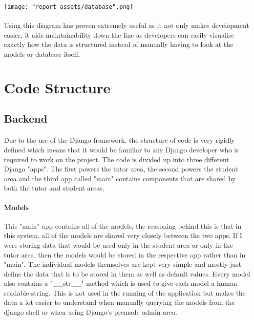 \documentclass[10pt]{report}
\begin{document}
	\vspace{+10px}
	\texttt{[image: "report assets/database".png]}
	
	\paragraph{}
	Using this diagram has proven extremely useful as it not only makes development easier, it aids
	maintainability down the line as developers can easily visualise exactly how the data is structured
	instead of manually having to look at the models or database itself.
	
	\section*{Code Structure}
	\subsection*{Backend}
	\paragraph{}
	Due to the use of the Django framework, the structure of code is very rigidly defined which means that
	it would be familiar to any Django developer who is required to work on the project.  The code is
	divided up into three different Django "apps".  The first powers the tutor area, the second powers the
	student area and the third app called "main" contains components that are shared by both the tutor and
	student areas.
	
	\paragraph{Models}
	This "main" app contains all of the models, the reasoning behind this is that in this system, all of
	the models are shared very closely between the two apps.  If I were	storing data that would be used
	only in the student area or only in the tutor area, then the models would be stored in the respective
	app rather than in "main".  The individual models themselves are kept very simple and mostly just
	define the data that is to be stored in them as well as default values.  Every model also contains a
	"\_\_str\_\_" method which is used to give each model a human readable string.  This is not used in
	the running of the application but makes the data a lot easier to understand when manually querying
	the models from the django shell or when using Django's premade admin area.
	
\end{document}
